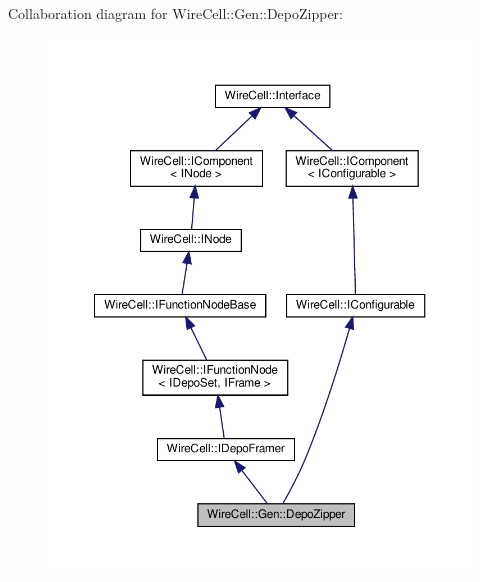 Collaboration diagram for Wire\+Cell\+:\+:Gen\+:\+:Depo\+Zipper\+:
\nopagebreak
\begin{figure}[H]
\begin{center}
\leavevmode
\includegraphics[width=350pt]{class_wire_cell_1_1_gen_1_1_depo_zipper__coll__graph}
\end{center}
\end{figure}
